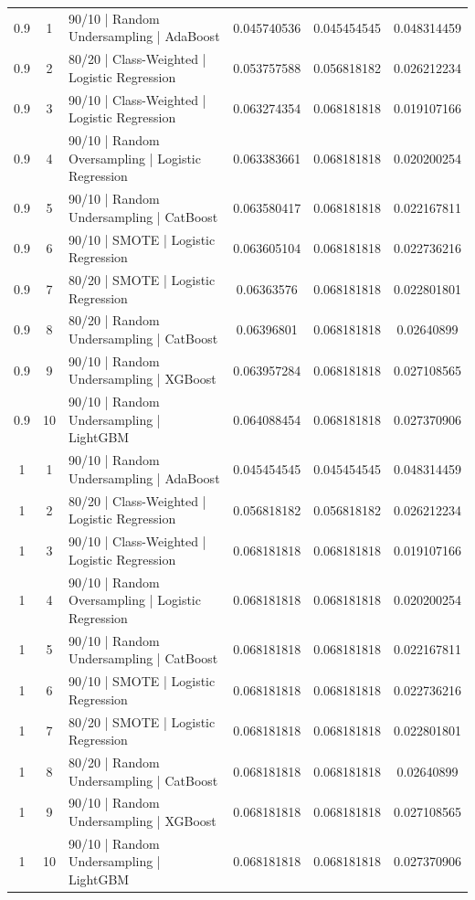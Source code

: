 \documentclass{article}
\begin{document}
\begin{longtable}{c c p{4cm} c c c}
0.9 & 1 & 90/10 | Random Undersampling | AdaBoost & 0.045740536 & 0.045454545 & 0.048314459 \\
0.9 & 2 & 80/20 | Class-Weighted | Logistic Regression & 0.053757588 & 0.056818182 & 0.026212234 \\
0.9 & 3 & 90/10 | Class-Weighted | Logistic Regression & 0.063274354 & 0.068181818 & 0.019107166 \\
0.9 & 4 & 90/10 | Random Oversampling | Logistic Regression & 0.063383661 & 0.068181818 & 0.020200254 \\
0.9 & 5 & 90/10 | Random Undersampling | CatBoost & 0.063580417 & 0.068181818 & 0.022167811 \\
0.9 & 6 & 90/10 | SMOTE | Logistic Regression & 0.063605104 & 0.068181818 & 0.022736216 \\
0.9 & 7 & 80/20 | SMOTE | Logistic Regression & 0.06363576 & 0.068181818 & 0.022801801 \\
0.9 & 8 & 80/20 | Random Undersampling | CatBoost & 0.06396801 & 0.068181818 & 0.02640899 \\
0.9 & 9 & 90/10 | Random Undersampling | XGBoost & 0.063957284 & 0.068181818 & 0.027108565 \\
0.9 & 10 & 90/10 | Random Undersampling | LightGBM & 0.064088454 & 0.068181818 & 0.027370906 \\
1 & 1 & 90/10 | Random Undersampling | AdaBoost & 0.045454545 & 0.045454545 & 0.048314459 \\
1 & 2 & 80/20 | Class-Weighted | Logistic Regression & 0.056818182 & 0.056818182 & 0.026212234 \\
1 & 3 & 90/10 | Class-Weighted | Logistic Regression & 0.068181818 & 0.068181818 & 0.019107166 \\
1 & 4 & 90/10 | Random Oversampling | Logistic Regression & 0.068181818 & 0.068181818 & 0.020200254 \\
1 & 5 & 90/10 | Random Undersampling | CatBoost & 0.068181818 & 0.068181818 & 0.022167811 \\
1 & 6 & 90/10 | SMOTE | Logistic Regression & 0.068181818 & 0.068181818 & 0.022736216 \\
1 & 7 & 80/20 | SMOTE | Logistic Regression & 0.068181818 & 0.068181818 & 0.022801801 \\
1 & 8 & 80/20 | Random Undersampling | CatBoost & 0.068181818 & 0.068181818 & 0.02640899 \\
1 & 9 & 90/10 | Random Undersampling | XGBoost & 0.068181818 & 0.068181818 & 0.027108565 \\
1 & 10 & 90/10 | Random Undersampling | LightGBM & 0.068181818 & 0.068181818 & 0.027370906 \\

\end{longtable}
\end{document}

